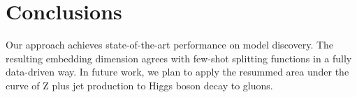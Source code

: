 \section{Conclusions}\label{sec:conclusions}

Our approach achieves state-of-the-art performance on model discovery.
The resulting embedding dimension agrees with few-shot splitting
functions in a fully data-driven way. In future work, we plan to apply
the resummed area under the curve of Z plus jet production to Higgs
boson decay to gluons.

